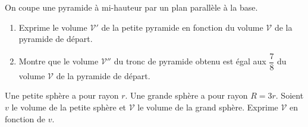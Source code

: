 \documentclass[a4paper,10pt]{report}
\begin{document}
\begin{ex}
On coupe une pyramide à mi-hauteur par un plan parallèle à la base.
\begin{enumerate}[font=\color{exer2}]
\item Exprime le volume $\mathcal{V'}$ de la petite pyramide en fonction du volume $\mathcal{V}$ de la pyramide de départ.
\item Montre que le volume $\mathcal{V''}$ du tronc de pyramide obtenu est égal aux $\dfrac{7}{8}$ du volume $\mathcal{V}$ de la pyramide de départ.
\end{enumerate}
\end{ex}

\begin{ex}
Une petite sphère a pour rayon $r$. Une grande sphère a pour rayon $R=3r$. Soient $v$ le volume de la petite sphère et $\mathcal{V}$ le volume de la grand sphère. Exprime $\mathcal{V}$ en fonction de $v$.
\end{ex}
\end{document}
